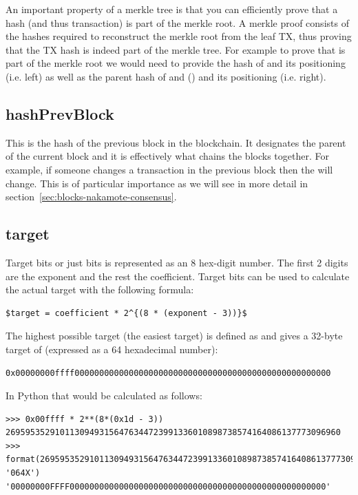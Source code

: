 An important property of a merkle tree is that you can efficiently prove that a hash (and thus transaction) is part of the merkle root. A merkle proof consists of the hashes required to reconstruct the merkle root from the leaf TX, thus proving that the TX hash is indeed part of the merkle tree. For example to prove that  is part of the merkle root we would need to provide the hash of  and its positioning (i.e. left) as well as the parent hash of  and  () and its positioning (i.e. right).

\subsection*{hashPrevBlock}
This is the hash of the previous block in the blockchain. It designates the parent of the current block and it is effectively what chains the blocks together. For example, if someone changes a transaction in the previous block then the  will change. This is of particular importance as we will see in more detail in section~\ref{sec:blocks-nakamote-consensus}.

\subsection*{target}
Target bits or just bits is represented as an 8 hex-digit number. The first 2 digits are the exponent and the rest the coefficient. Target bits can be used to calculate the actual target with the following formula:

\begin{emphbox}
\begin{lstlisting}[style=Pseudomath]
    $target = coefficient * 2^{(8 * (exponent - 3))}$
\end{lstlisting}
\end{emphbox}

The highest possible target (the easiest target) is defined as  and gives a 32-byte target of (expressed as a 64 hexadecimal number):

\small
\begin{emphbox}
\begin{lstlisting}[style=Pseudomath]
0x00000000ffff0000000000000000000000000000000000000000000000000000
\end{lstlisting}
\end{emphbox}
\normalsize

In Python that would be calculated as follows:
\vspace{1em}
\begin{lstlisting}[style=Python,label={lst:encodings-1},caption={Python examples},captionpos=b]
>>> 0x00ffff * 2**(8*(0x1d - 3))
26959535291011309493156476344723991336010898738574164086137773096960
>>> format(26959535291011309493156476344723991336010898738574164086137773096960, '064X')
'00000000FFFF0000000000000000000000000000000000000000000000000000'
\end{lstlisting}
\vspace{1em}



